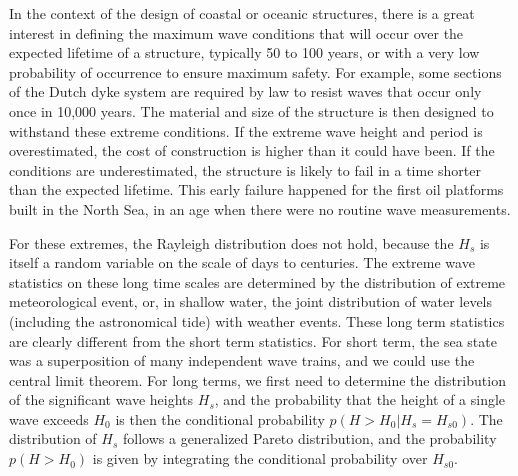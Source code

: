 In the context of the design of coastal or oceanic structures,  there is a great interest in defining the 
maximum wave conditions that will occur over the expected lifetime of a structure, typically 50 to 100 years, 
or with a very low probability of occurrence to ensure maximum safety. For example, some sections of the Dutch dyke system
are required by law to resist waves that occur only once in 10,000 years. 
The material and size of the structure is then designed to withstand 
these extreme conditions. If the extreme wave height and period is overestimated, the cost of construction 
is higher than it could have been. If the conditions are underestimated, the structure is likely to fail in a time shorter
than the expected lifetime. This early failure happened for the first oil platforms built in the North Sea, in an age
when there were no routine wave measurements. 

For these extremes, the Rayleigh distribution does not hold, because the $H_s$ is itself a random variable on the 
scale of days to centuries. The extreme wave statistics on these long time scales are determined by the 
distribution of extreme meteorological event, or, in shallow water, the joint distribution of water levels (including 
the astronomical tide) with weather events. These long term statistics are clearly different from the short term statistics. 
For short term, the sea state was a superposition of many independent wave trains, and we could use the central limit theorem. 
For long terms, we first need to determine the distribution of the significant wave heights  $H_{s}$, and the probability 
that the height of a single wave exceeds $H_0$ is then the conditional 
probability $p(H > H_0  | H_s = H_{s0})$. The distribution of $H_s$ follows a generalized Pareto distribution, 
and the probability $p(H > H_0)$ is given by integrating the conditional probability over $H_{s0}$. 

